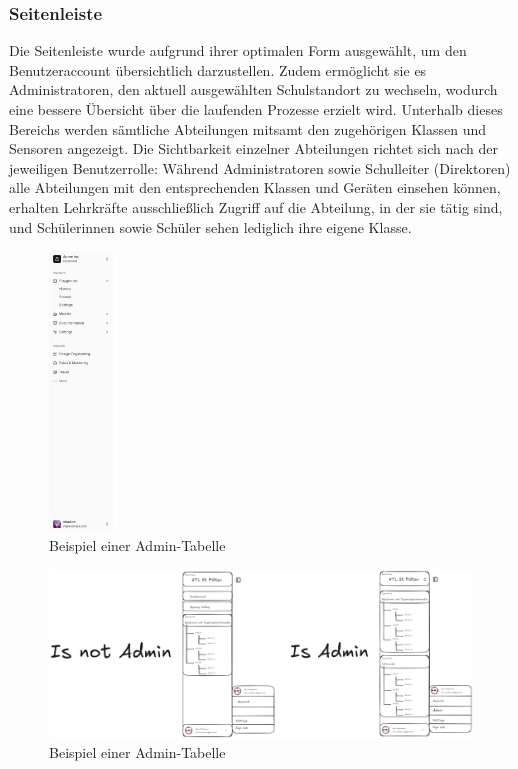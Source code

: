 \begin{inhalt}
\newpage

\subsubsection{Seitenleiste}

Die Seitenleiste \cite{ShadCNSidebar} wurde aufgrund ihrer optimalen Form ausgewählt, um den Benutzeraccount übersichtlich darzustellen. Zudem ermöglicht sie es Administratoren, den aktuell ausgewählten Schulstandort zu wechseln, wodurch eine bessere Übersicht über die laufenden Prozesse erzielt wird. Unterhalb dieses Bereichs werden sämtliche Abteilungen mitsamt den zugehörigen Klassen und Sensoren angezeigt. Die Sichtbarkeit einzelner Abteilungen richtet sich nach der jeweiligen Benutzerrolle: Während Administratoren sowie Schulleiter (Direktoren) alle Abteilungen mit den entsprechenden Klassen und Geräten einsehen können, erhalten Lehrkräfte ausschließlich Zugriff auf die Abteilung, in der sie tätig sind, und Schülerinnen sowie Schüler sehen lediglich ihre eigene Klasse.

\begin{figure} 
\centering 
\includegraphics[width=0.15\textwidth]{files/Thomas/pics/Design-Grundlagen/Frontend/Sidebar/sidebar.png} 
\caption[Bildbezeichnung für Abbildungsverzeichnis]{Beispiel einer Admin-Tabelle} 
\label{fig:gehaeuse_internet_bild} 
\end{figure}

\clearpage

\begin{figure}[!htb] 
\centering 
\includegraphics[width=1\textwidth]{files/Thomas/pics/Design-Grundlagen/Frontend/Sidebar/sidebar-adminvsnotadmin.png} 
\caption[Bildbezeichnung für Abbildungsverzeichnis]{Beispiel einer Admin-Tabelle} 
\label{fig:gehaeuse_internet_bild} 
\end{figure}



\end{inhalt}
